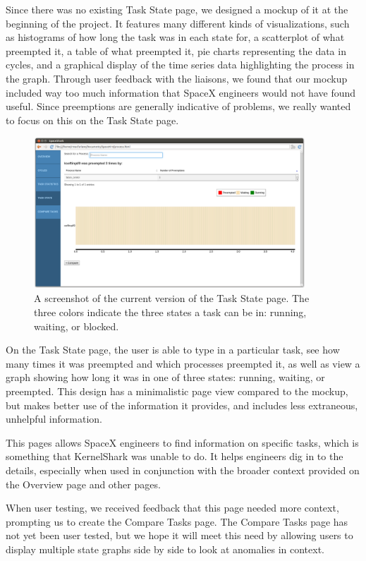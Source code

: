 \documentclass{hmcclinic}
\begin{document}
Since there was no existing Task State page, we designed a mockup of it at the
beginning of the project. It features many different kinds of visualizations,
such as histograms of how long the task was in each state for, a scatterplot of 
what preempted it, a table of what preempted it, pie charts representing the 
data in cycles, and a graphical display of the time series data highlighting 
the process in the graph. Through user feedback with the liaisons, we found 
that our mockup included way too much information that SpaceX engineers would 
not have found useful. Since preemptions are generally
indicative of problems, we really wanted to focus on this on the Task State
page.

\begin{figure}
\begin{center}
\includegraphics[width=4in]{task-state-page.png}
\caption{A screenshot of the current version of the Task State page. The three
colors indicate the three states a task can be in: running, waiting, or blocked.}
\end{center}
\end{figure}

On the Task State page, the user is able to type in a particular task, see
how many times it was preempted and which processes preempted it, as well as
view a graph showing how long it was in one of three states: running, waiting,
or preempted. This design has a minimalistic page view compared to the mockup,
but makes better use of the information it provides, and includes less
extraneous, unhelpful information.

This pages allows SpaceX engineers to find information on specific tasks, which
is something that KernelShark was unable to do. It helps engineers dig in to the
details, especially when used in conjunction with the broader context provided
on the Overview page and other pages.

When user testing, we received feedback that this page needed more context,
prompting us to create the Compare Tasks page. The Compare Tasks page has not
yet been user tested, but we hope it will meet this need by allowing users to
display multiple state graphs side by side to look at anomalies in context.
\end{document}
